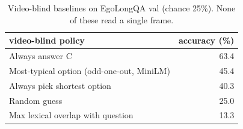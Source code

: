 \begin{table}[t]
\centering
\small
\caption{Video-blind baselines on EgoLongQA val (chance 25\%). None of these read a single frame.}
\label{tab:blind_baselines}
\begin{tabular}{lr}
\toprule
video-blind policy & accuracy (\%) \\
\midrule
Always answer C & 63.4 \\
Most-typical option (odd-one-out, MiniLM) & 45.4 \\
Always pick shortest option & 40.3 \\
Random guess & 25.0 \\
Max lexical overlap with question & 13.3 \\
\bottomrule
\end{tabular}
\end{table}
